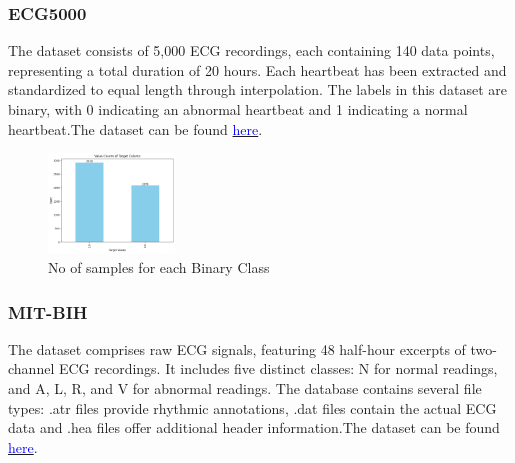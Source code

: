 \documentclass[nonacm,sigconf]{acmart}
\begin{document}
\subsubsection{\textbf{ECG5000}}
The dataset consists of 5,000 ECG recordings, each containing 140 data points, representing a total duration of 20 hours. Each heartbeat has been extracted and standardized to equal length through interpolation. The labels in this dataset are binary, with 0 indicating an abnormal heartbeat and 1 indicating a normal heartbeat.The dataset can be found 
\href{http://storage.googleapis.com/download.tensorflow.org/data/ecg.csv}{\textcolor{blue}{here}}.

\begin{figure}[h]
  \centering
  \includegraphics[width=0.3\textwidth]{ecg5000/binary.png}
  \caption{No of samples for each Binary Class}
\end{figure}

\subsubsection{\textbf{MIT-BIH}}
The dataset comprises raw ECG signals, featuring 48 half-hour excerpts of two-channel ECG recordings. It includes five distinct classes: N for normal readings, and A, L, R, and V for abnormal readings. The database contains several file types: .atr files provide rhythmic annotations, .dat files contain the actual ECG data and .hea files offer additional header information.The dataset can be found 
\href{https://physionet.org/content/mitdb/1.0.0/}{\textcolor{blue}{here}}.
\end{document}
